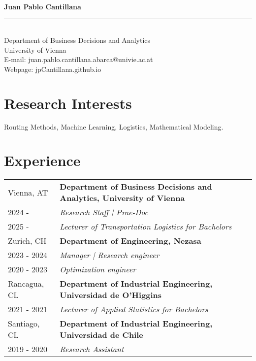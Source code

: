 \documentclass[10pt, a4paper]{article}
\begin{document}
\begin{center}
    {\LARGE \textbf{Juan Pablo Cantillana}} \\[0.2cm]
    \rule{\textwidth}{0.4pt} \\[0.2cm] %
    Department of Business Decisions and Analytics \\
    University of Vienna \\
    E-mail: juan.pablo.cantillana.abarca@univie.ac.at \\
    Webpage: jpCantillana.github.io\\
\end{center}

\section*{Research Interests}
Routing Methods, Machine Learning, Logistics, Mathematical Modeling.

\section*{Experience}

\noindent
\begin{tabular}{@{} p{} p{} @{}}
    Vienna, AT & \textbf{Department of Business Decisions and Analytics, University of Vienna} \\
    2024 -  & \textit{Research Staff | Prae-Doc} \\
    2025 -  & \textit{Lecturer of Transportation Logistics for Bachelors} \\
    Zurich, CH & \textbf{Department of Engineering, Nezasa} \\
    2023 - 2024 & \textit{Manager | Research engineer} \\
    2020 - 2023 & \textit{Optimization engineer} \\
    Rancagua, CL & \textbf{Department of Industrial Engineering, Universidad de O'Higgins} \\
    2021 - 2021 & \textit{Lecturer of Applied Statistics for Bachelors} \\
    Santiago, CL & \textbf{Department of Industrial Engineering, Universidad de Chile} \\
    2019 - 2020 & \textit{Research Assistant} \\
\end{tabular}

\end{document}
